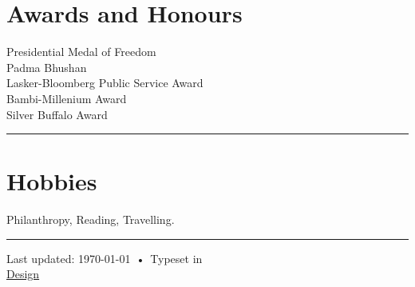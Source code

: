 \documentclass[a4paper]{article}
\begin{document}
\section* {Awards and Honours}

Presidential Medal of Freedom\\[3mm]
Padma Bhushan\\[3mm]
Lasker-Bloomberg Public Service Award\\[3mm]
Bambi-Millenium Award\\[3mm]
Silver Buffalo Award\\[3mm]

\vspace{4mm} \hrule \vspace{3mm}



\section* {Hobbies}

Philanthropy, Reading, Travelling.

\vspace{4mm} \hrule \vspace{3mm}



\begin{center}
{\scriptsize  Last updated: \today\ •\ 
Typeset in \href{https://tug.org/xetex/}{\XeTeX }\\
\href{https://github.com/Strohy/Resume}{Design}}
\end{center}
\end{document}
